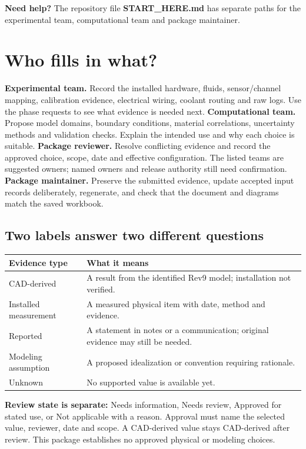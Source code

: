\documentclass[11pt]{article}
\begin{document}
\textbf{Need help?} The repository file \textbf{START\_HERE.md} has separate paths for the experimental team, computational team and package maintainer.
\clearpage\section{Who fills in what?}
\textbf{Experimental team.} Record the installed hardware, fluids, sensor/channel mapping, calibration evidence, electrical wiring, coolant routing and raw logs. Use the phase requests to see what evidence is needed next.
\textbf{Computational team.} Propose model domains, boundary conditions, material correlations, uncertainty methods and validation checks. Explain the intended use and why each choice is suitable.
\textbf{Package reviewer.} Resolve conflicting evidence and record the approved choice, scope, date and effective configuration. The listed teams are suggested owners; named owners and release authority still need confirmation.
\textbf{Package maintainer.} Preserve the submitted evidence, update accepted input records deliberately, regenerate, and check that the document and diagrams match the saved workbook.
\subsection*{Two labels answer two different questions}
\small\setlength{\tabcolsep}{4pt}
\begin{longtable}{p{}p{}}
\toprule
\textbf{Evidence type} & \textbf{What it means} \\\midrule\endhead
CAD-derived & A result from the identified Rev9 model; installation not verified. \\[3pt]
Installed measurement & A measured physical item with date, method and evidence. \\[3pt]
Reported & A statement in notes or a communication; original evidence may still be needed. \\[3pt]
Modeling assumption & A proposed idealization or convention requiring rationale. \\[3pt]
Unknown & No supported value is available yet. \\[3pt]
\bottomrule\end{longtable}\normalsize
\textbf{Review state is separate:} Needs information, Needs review, Approved for stated use, or Not applicable with a reason. Approval must name the selected value, reviewer, date and scope. A CAD-derived value stays CAD-derived after review. This package establishes no approved physical or modeling choices.
\end{document}
